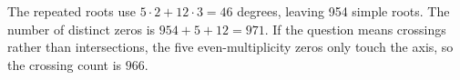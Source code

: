 The repeated roots use $5\cdot2+12\cdot3=46$ degrees, leaving 954 simple roots. The number of distinct zeros is $954+5+12=\boxed{971}$. If the question means crossings rather than intersections, the five even-multiplicity zeros only touch the axis, so the crossing count is $\boxed{966}$.
